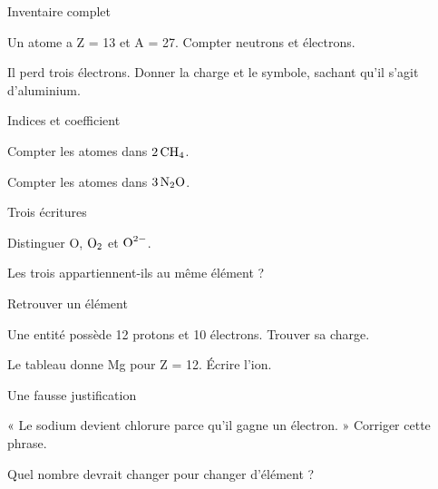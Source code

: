 \par\noindent\begin{minipage}{\linewidth}
\begin{exercice}[2]{Inventaire complet}
\begin{questions}
\item Un atome a Z = 13 et A = 27. Compter neutrons et électrons.
\item Il perd trois électrons. Donner la charge et le symbole, sachant qu’il s’agit d’aluminium.
\end{questions}
\end{exercice}
\end{minipage}
\par\noindent\begin{minipage}{\linewidth}
\begin{exercice}[2]{Indices et coefficient}
\begin{questions}
\item Compter les atomes dans $2\,\ce{CH4}$.
\item Compter les atomes dans $3\,\ce{N2O}$.
\end{questions}
\end{exercice}
\end{minipage}
\par\noindent\begin{minipage}{\linewidth}
\begin{exercice}[2]{Trois écritures}
\begin{questions}
\item Distinguer O, $\ce{O2}$ et $\ce{O^{2-}}$.
\item Les trois appartiennent-ils au même élément ?
\end{questions}
\end{exercice}
\end{minipage}
\clearpage{}
\par\noindent\begin{minipage}{\linewidth}
\begin{exercice}[3]{Retrouver un élément}
\begin{questions}
\item Une entité possède 12 protons et 10 électrons. Trouver sa charge.
\item Le tableau donne Mg pour Z = 12. Écrire l’ion.
\end{questions}
\end{exercice}
\end{minipage}
\par\noindent\begin{minipage}{\linewidth}
\begin{exercice}[3]{Une fausse justification}
\begin{questions}
\item « Le sodium devient chlorure parce qu’il gagne un électron. » Corriger cette phrase.
\item Quel nombre devrait changer pour changer d’élément ?
\end{questions}
\end{exercice}
\end{minipage}
